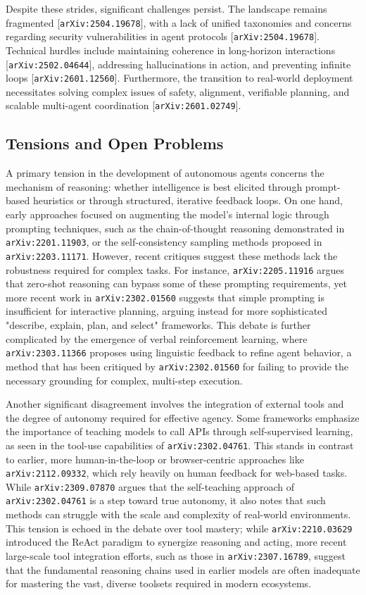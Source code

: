 \documentclass[11pt]{article}
\begin{document}
Despite these strides, significant challenges persist. The landscape remains fragmented [\texttt{arXiv:2504.19678}], with a lack of unified taxonomies and concerns regarding security vulnerabilities in agent protocols [\texttt{arXiv:2504.19678}]. Technical hurdles include maintaining coherence in long-horizon interactions [\texttt{arXiv:2502.04644}], addressing hallucinations in action, and preventing infinite loops [\texttt{arXiv:2601.12560}]. Furthermore, the transition to real-world deployment necessitates solving complex issues of safety, alignment, verifiable planning, and scalable multi-agent coordination [\texttt{arXiv:2601.02749}].

\subsection{Tensions and Open Problems}

A primary tension in the development of autonomous agents concerns the mechanism of reasoning: whether intelligence is best elicited through prompt-based heuristics or through structured, iterative feedback loops. On one hand, early approaches focused on augmenting the model's internal logic through prompting techniques, such as the chain-of-thought reasoning demonstrated in \texttt{arXiv:2201.11903}, or the self-consistency sampling methods proposed in \texttt{arXiv:2203.11171}. However, recent critiques suggest these methods lack the robustness required for complex tasks. For instance, \texttt{arXiv:2205.11916} argues that zero-shot reasoning can bypass some of these prompting requirements, yet more recent work in \texttt{arXiv:2302.01560} suggests that simple prompting is insufficient for interactive planning, arguing instead for more sophisticated "describe, explain, plan, and select" frameworks. This debate is further complicated by the emergence of verbal reinforcement learning, where \texttt{arXiv:2303.11366} proposes using linguistic feedback to refine agent behavior, a method that has been critiqued by \texttt{arXiv:2302.01560} for failing to provide the necessary grounding for complex, multi-step execution.

Another significant disagreement involves the integration of external tools and the degree of autonomy required for effective agency. Some frameworks emphasize the importance of teaching models to call APIs through self-supervised learning, as seen in the tool-use capabilities of \texttt{arXiv:2302.04761}. This stands in contrast to earlier, more human-in-the-loop or browser-centric approaches like \texttt{arXiv:2112.09332}, which rely heavily on human feedback for web-based tasks. While \texttt{arXiv:2309.07870} argues that the self-teaching approach of \texttt{arXiv:2302.04761} is a step toward true autonomy, it also notes that such methods can struggle with the scale and complexity of real-world environments. This tension is echoed in the debate over tool mastery; while \texttt{arXiv:2210.03629} introduced the ReAct paradigm to synergize reasoning and acting, more recent large-scale tool integration efforts, such as those in \texttt{arXiv:2307.16789}, suggest that the fundamental reasoning chains used in earlier models are often inadequate for mastering the vast, diverse toolsets required in modern ecosystems.
\end{document}
